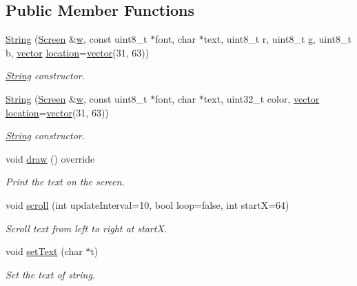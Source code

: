 \subsection*{Public Member Functions}
\begin{DoxyCompactItemize}
\item 
\hyperlink{class_string_a5fabbb03b070a2d5c6916933755b7e54}{String} (\hyperlink{class_screen}{Screen} \&\hyperlink{class_graphics_a7a73ddd0d3cf1b67fc54f303be017c3b}{w}, const uint8\+\_\+t $\ast$font, char $\ast$text, uint8\+\_\+t r, uint8\+\_\+t g, uint8\+\_\+t b, \hyperlink{classvector}{vector} \hyperlink{class_graphics_a88c2112c7a3db3ee56f4c7fe2cac6055}{location}=\hyperlink{classvector}{vector}(31, 63))
\begin{DoxyCompactList}\small\item\em \hyperlink{class_string}{String} constructor. \end{DoxyCompactList}\item 
\hyperlink{class_string_a8cb33c01999d1f29401e03980f9e6320}{String} (\hyperlink{class_screen}{Screen} \&\hyperlink{class_graphics_a7a73ddd0d3cf1b67fc54f303be017c3b}{w}, const uint8\+\_\+t $\ast$font, char $\ast$text, uint32\+\_\+t color, \hyperlink{classvector}{vector} \hyperlink{class_graphics_a88c2112c7a3db3ee56f4c7fe2cac6055}{location}=\hyperlink{classvector}{vector}(31, 63))
\begin{DoxyCompactList}\small\item\em \hyperlink{class_string}{String} constructor. \end{DoxyCompactList}\item 
void \hyperlink{class_string_a6f00d1cdc1842feb404809c717a62581}{draw} () override
\begin{DoxyCompactList}\small\item\em Print the text on the screen. \end{DoxyCompactList}\item 
void \hyperlink{class_string_a433da031c73912ed5d6e69cf64fc5f11}{scroll} (int update\+Interval=10, bool loop=false, int startX=64)
\begin{DoxyCompactList}\small\item\em Scroll text from left to right at startX. \end{DoxyCompactList}\item 
void \hyperlink{class_string_a37aa31373e430a39e216786a3a3cb929}{set\+Text} (char $\ast$t)
\begin{DoxyCompactList}\small\item\em Set the text of string. \end{DoxyCompactList}\item 

\end{DoxyCompactItemize}
